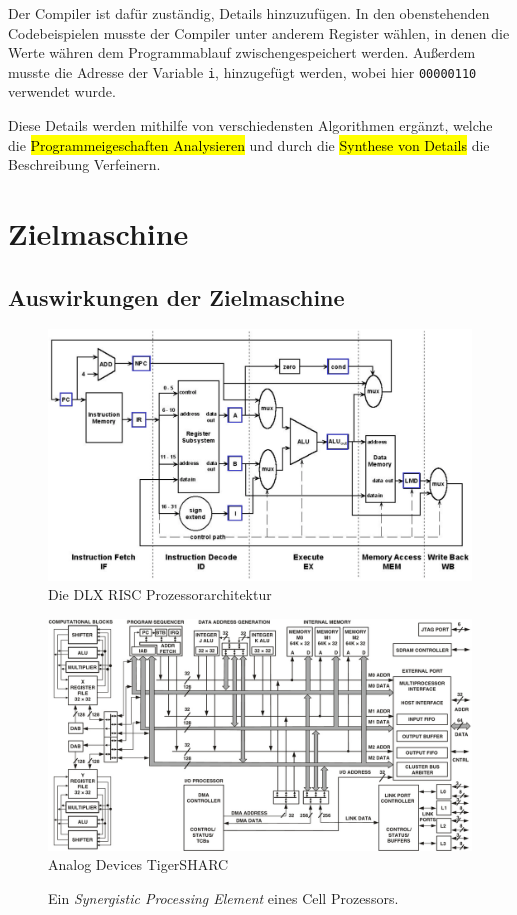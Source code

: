\documentclass[ngerman]{scrartcl}
\begin{document}
Der Compiler ist dafür zuständig, Details hinzuzufügen. In den obenstehenden Codebeispielen musste der Compiler unter anderem Register wählen, in denen die Werte währen dem Programmablauf zwischengespeichert werden. Außerdem musste die Adresse der Variable \verb|i|, hinzugefügt werden, wobei hier \verb|00000110| verwendet wurde.

Diese Details werden mithilfe von verschiedensten Algorithmen ergänzt, welche die \hl{Programmeigeschaften Analysieren} und durch die \hl{Synthese von Details} die Beschreibung Verfeinern.

\section{Zielmaschine}

\subsection{Auswirkungen der Zielmaschine}

\begin{figure}\label{fig:dlx}
\includegraphics[width=\textwidth]{media/dlx}
\caption{Die DLX RISC Prozessorarchitektur}
\end{figure}
\begin{figure}
\includegraphics[width=\textwidth]{media/tigersharc}
\caption{Analog Devices TigerSHARC}\label{fig:tigersharc}
\end{figure}
\begin{figure}
\caption{Ein \emph{Synergistic Processing Element} eines Cell Prozessors.}\label{fig:spe}
\end{figure}
\end{document}
